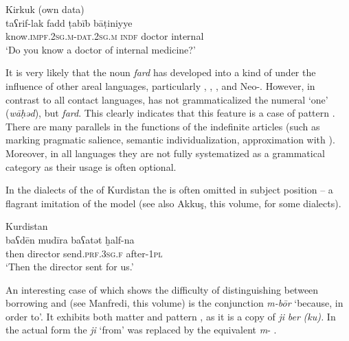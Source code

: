 \documentclass[output=paper]{langsci/langscibook}
\begin{document}
\ea\label{fadd} 
{Kirkuk (own data)}\\
\gll taʕrif-lak fadd ṭabīb bāṭiniyye\\
     know.\textsc{impf.2sg.m-dat.2sg.m} \textsc{indf} doctor internal \\
\glt ‘Do you know a doctor of internal medicine?'
\z

It is very likely that the noun \textit{fard} has developed into a kind of  under the influence of other areal languages, particularly , , , and Neo-. However, in contrast to all contact languages,   has not grammaticalized the numeral ‘one’ (\textit{wāḥəd}), but \textit{fard}. This clearly indicates that this feature is a case of pattern . There are many parallels in the functions of the indefinite articles (such as marking pragmatic salience, semantic individualization, approximation with ). Moreover, in all languages they are not fully systematized as a grammatical category as their usage is often optional. 

In the dialects of the  of Kurdistan the   is often omitted in subject position – a flagrant imitation of the  model (see also Akkuş, this volume, for some  dialects).

\ea 
{Kurdistan  \citep[71]{Jastrow1990chapter}} \\
\gll baʕdēn mudīra baʕatət ḫalf-na\\
     then director send.\textsc{prf.3sg.f} after-\textsc{1pl}\\
\glt ‘Then the director sent for us.’
\z

An interesting case of  which shows the difficulty of distinguishing between borrowing and  (see Manfredi, this volume) is the conjunction \textit{m-bōr} ‘because, in order to’. It exhibits both matter and pattern , as it is a copy of  \textit{ji} \textit{ber} \textit{(ku).} In the actual form the  \textit{ji} ‘from’ was replaced by the  equivalent \textit{m}{}- \citep[64]{Jastrow1979}. 
\end{document}
